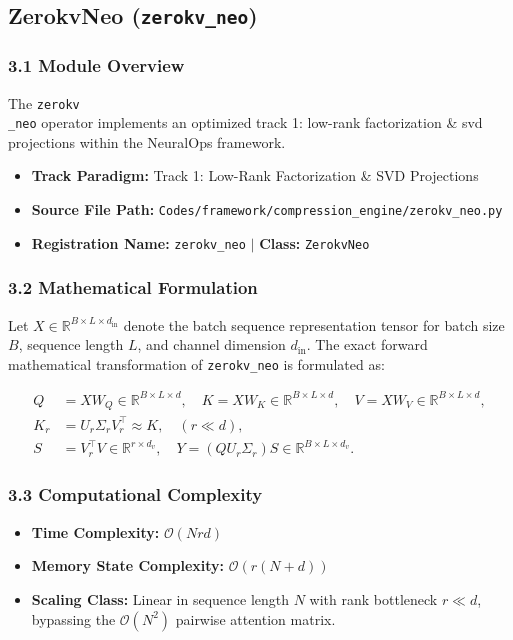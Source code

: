 \subsection{ZerokvNeo (\texttt{zerokv\_neo})}
\label{sec:app_module_zerokv_neo}

\subsubsection*{3.1 Module Overview}
The \texttt{zerokv\\_neo} operator implements an optimized track 1: low-rank factorization \& svd projections within the NeuralOps framework.
\begin{itemize}
    \item \textbf{Track Paradigm:} Track 1: Low-Rank Factorization & SVD Projections
    \item \textbf{Source File Path:} \texttt{Codes/framework/compression\_engine/zerokv\_neo.py}
    \item \textbf{Registration Name:} \texttt{zerokv\_neo} $\mid$ \textbf{Class:} \texttt{ZerokvNeo}
\end{itemize}

\subsubsection*{3.2 Mathematical Formulation}
Let $X \in \mathbb{R}^{B \times L \times d_{\text{in}}}$ denote the batch sequence representation tensor for batch size $B$, sequence length $L$, and channel dimension $d_{\text{in}}$. The exact forward mathematical transformation of \texttt{zerokv\_neo} is formulated as:

\begin{align}
Q &= X W_Q \in \mathbb{R}^{B \times L \times d}, \quad K = X W_K \in \mathbb{R}^{B \times L \times d}, \quad V = X W_V \in \mathbb{R}^{B \times L \times d}, \\
K_r &= U_r \Sigma_r V_r^\top \approx K, \quad (r \ll d), \\
S &= V_r^\top V \in \mathbb{R}^{r \times d_v}, \quad Y = (Q U_r \Sigma_r) S \in \mathbb{R}^{B \times L \times d_v}.
\end{align}


\subsubsection*{3.3 Computational Complexity}
\begin{itemize}
    \item \textbf{Time Complexity:} $\mathcal{O}(N r d)$
    \item \textbf{Memory State Complexity:} $\mathcal{O}(r(N + d))$
    \item \textbf{Scaling Class:} Linear in sequence length $N$ with rank bottleneck $r \ll d$, bypassing the $\mathcal{O}(N^2)$ pairwise attention matrix.
\end{itemize}

